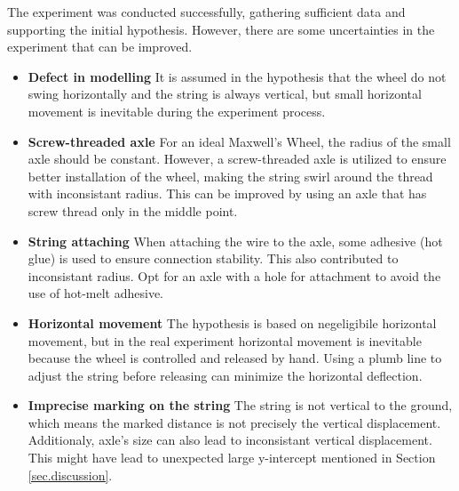 \documentclass[a4paper]{article}
\begin{document}
The experiment was conducted successfully, gathering sufficient data and supporting the initial hypothesis. However, there are some uncertainties in the experiment that can be improved. 

\begin{itemize}
    \item \textbf{Defect in modelling} It is assumed in the hypothesis that the wheel do not swing horizontally and the string is always vertical, but small horizontal movement is inevitable during the experiment process.
    \item \textbf{Screw-threaded axle} For an ideal Maxwell's Wheel, the radius of the small axle should be constant. However, a screw-threaded axle is utilized to ensure better installation of the wheel, making the string swirl around the thread with inconsistant radius. This can be improved by using an axle that has screw thread only in the middle point. 
    \item \textbf{String attaching} When attaching the wire to the axle, some adhesive (hot glue) is used to ensure connection stability. This also contributed to inconsistant radius. Opt for an axle with a hole for attachment to avoid the use of hot-melt adhesive. 
    \item \textbf{Horizontal movement} The hypothesis is based on negeligibile horizontal movement, but in the real experiment horizontal movement is inevitable because the wheel is controlled and released by hand. Using a plumb line to adjust the string before releasing can minimize the horizontal deflection.
    \item \textbf{Imprecise marking on the string} The string is not vertical to the ground, which means the marked distance is not precisely the vertical displacement. Additionaly, axle's size can also lead to inconsistant vertical displacement. This might have lead to unexpected large y-intercept mentioned in Section \ref{sec.discussion}.
\end{itemize}



\end{document}
